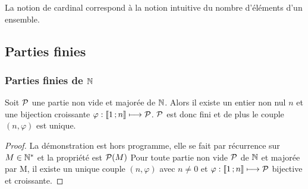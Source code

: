 La notion de cardinal correspond à la notion intuitive du nombre d'éléments d'un ensemble.

\subsection{Parties finies}

\subsubsection{Parties finies de $\N$}

\begin{theo}\label{theo:partfinN}
  Soit $\P$ une partie non vide et majorée de $\N$. Alors il existe un entier non nul $n$ et une bijection croissante $\varphi:\intervalleentier{1}{n} \longmapsto \P$. $\P$ est donc fini et de plus le couple $(n,\varphi)$ est unique.
\end{theo}
\begin{proof}
  La démonstration est hors programme, elle se fait par récurrence sur $M\in\N^*$ et la propriété est $\P(M)$ Pour toute partie non vide $\P$ de $\N$ et majorée par M, il existe un unique couple $(n,\varphi)$ avec $n\neq 0$ et $\varphi:\intervalleentier{1}{n} \longmapsto \P$ bijective et croissante. 
\end{proof}

